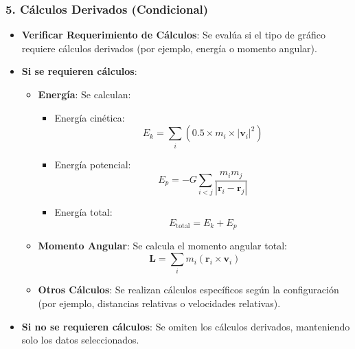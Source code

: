 \subsubsection*{5. Cálculos Derivados (Condicional)}
\begin{itemize}
    \item \textbf{Verificar Requerimiento de Cálculos}: Se evalúa si el tipo de gráfico requiere cálculos derivados (por ejemplo, energía o momento angular).
    \item \textbf{Si se requieren cálculos}:
    \begin{itemize}
        \item \textbf{Energía}: Se calculan:
        \begin{itemize}
            \item Energía cinética:
            \[
            E_k = \sum_{i} (0.5 \times m_i \times |\mathbf{v}_i|^2)
            \]
            \item Energía potencial:
            \[
            E_p = -G \sum_{i < j} \frac{m_i m_j}{|\mathbf{r}_i - \mathbf{r}_j|}
            \]
            \item Energía total:
            \[
            E_{\text{total}} = E_k + E_p
            \]
        \end{itemize}
        \item \textbf{Momento Angular}: Se calcula el momento angular total:
        \[
        \mathbf{L} = \sum_{i} m_i (\mathbf{r}_i \times \mathbf{v}_i)
        \]
        \item \textbf{Otros Cálculos}: Se realizan cálculos específicos según la configuración (por ejemplo, distancias relativas o velocidades relativas).
    \end{itemize}
    \item \textbf{Si no se requieren cálculos}: Se omiten los cálculos derivados, manteniendo solo los datos seleccionados.
\end{itemize}

